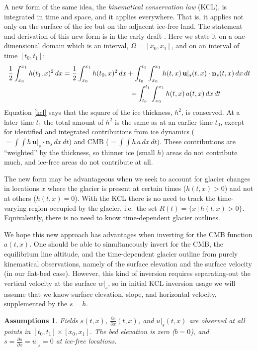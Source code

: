 \documentclass[letterpaper,final,12pt,reqno]{amsart}
\newtheorem*{assumptions}{Assumptions}
\newcommand{\bn}{\mathbf{n}}
\newcommand{\bu}{\mathbf{u}}
\begin{document}
A new form of the same idea, the \emph{kinematical conservation law} (KCL), is integrated in time and space, and it applies everywhere.  That is, it applies not only on the surface of the ice but on the adjacent ice-free land.  The statement and derivation of this new form is in the early draft \cite{Bueler2022}.  Here we state it on a one-dimensional domain which is an interval, $\Omega=[x_0,x_1]$, and on an interval of time $[t_0,t_1]$:
\begin{align}
\frac{1}{2} \int_{x_0}^{x_1} h(t_1,x)^2\,dx &= \frac{1}{2} \int_{x_0}^{x_1} h(t_0,x)^2\,dx + \int_{t_0}^{t_1} \int_{x_0}^{x_1} h(t,x)\, \bu|_s(t,x)\cdot \bn_s(t,x) \,dx\,dt \label{kcl} \\
  &\hspace{34mm} + \int_{t_0}^{t_1} \int_{x_0}^{x_1} h(t,x)\, a(t,x) \,dx\,dt \notag
\end{align}
Equation \eqref{kcl} says that the square of the ice thickness, $h^2$, is conserved.  At a later time $t_1$ the total amount of $h^2$ is the same as at an earlier time $t_0$, except for identified and integrated contributions from ice dynamics ($=\int \int h\, \bu|_s \cdot \bn_s \,dx\,dt$) and CMB ($=\int \int h\, a \,dx\,dt$).  These contributions are ``weighted'' by the thickness, so thinner ice (small $h$) areas do not contribute much, and ice-free areas do not contribute at all.

The new form may be advantageous when we seek to account for glacier changes in locations $x$ where the glacier is present at certain times ($h(t,x)>0$) and not at others ($h(t,x)=0$).  With the KCL there is no need to track the time-varying region occupied by the glacier, i.e.~the set $R(t) = \{x\,|\,h(t,x)>0\}$.  Equivalently, there is no need to know time-dependent glacier outlines.

We hope this new approach has advantages when inverting for the CMB function $a(t,x)$.  One should be able to simultaneously invert for the CMB, the equilibrium line altitude, and the time-dependent glacier outline from purely kinematical observations, namely of the surface elevation and the surface velocity (in our flat-bed case).  However, this kind of inversion requires separating-out the vertical velocity at the surface $w|_s$, so in initial KCL inversion usage we will assume that we know surface elevation, slope, and horizontal velocity, supplemented by the $s=h$.

\begin{assumptions}  Fields $s(t,x)$, $\frac{\partial s}{\partial x}(t,x)$, and $u|_s(t,x)$ are observed at all points in $[t_0,t_1] \times [x_0,x_1]$.  The bed elevation is zero ($b=0$), and $s = \frac{\partial s}{\partial x} = u|_s =0$ at ice-free locations. \end{assumptions}
\end{document}

